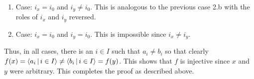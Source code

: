 {{\begin{enumerate}
\begin{enumerate}
\begin{enumerate}
\begin{enumerate}
            Since $i_y \neq i_x$ and $i_y = i_0$ and $x = \a_{i_x}$, we have $a_{i_y} = \a_{i_y} \neq b_{i_y}$.
          \end{enumerate}
        \item Case: $a_{i_x} = x \neq \a_{i_x}$.
          \begin{enumerate}
          \item Case: $b_{i_y} = y = \a_{i_y}$.
            Since $i_y \neq i_x$ and $i_y = i_0$ and $x \neq \a_{i_x}$, we have $a_{i_y} = \b_{i_y} \neq \a_{i_y} = b_{i_y}$.
          \item Case: $b_{i_y} = y \neq \a_{i_y}$.
            Since $i_x \neq i_y$ and $i_x \neq i_0$ and $y \neq \a_{i_y}$, we have $b_{i_x} = \a_{i_x} \neq a_{i_x}$.
          \end{enumerate}
        \end{enumerate}
      \item Case: $i_x = i_0$ and $i_y \neq i_0$.
        This is analogous  to the previous case 2.b with the roles of $i_x$ and $i_y$ reversed.
      \item Case: $i_x = i_0$ and $i_y = i_0$.
        This is impossible since $i_x \neq i_y$.
      \end{enumerate}
    \end{enumerate}
    Thus, in all cases, there is an $i \in I$ such that $a_i \neq b_i$ so that clearly $f(x) = \left\langle a_i \,|\, i \in I \right\rangle \neq \left\langle b_i \,|\, i \in I \right\rangle = f(y)$.
    This shows that $f$ is injective since $x$ and $y$ were arbitrary.
    This completes the proof as described above.
  }
}

